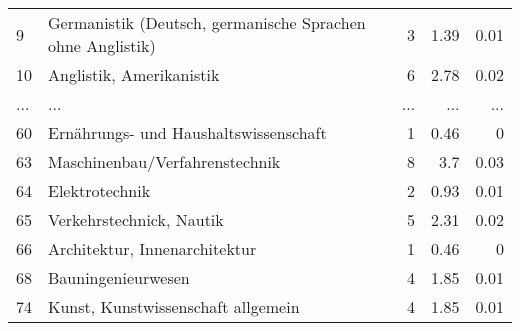 \begin{longtable}{lXrrr}
        9 & \multicolumn{1}{X}{Germanistik (Deutsch, germanische Sprachen ohne Anglistik)} & %
          \num{3} &
          \num[round-mode=places,round-precision=2]{1.39} &
          \num[round-mode=places,round-precision=2]{0.01} \\
        10 & \multicolumn{1}{X}{Anglistik, Amerikanistik} & %
          \num{6} &
          \num[round-mode=places,round-precision=2]{2.78} &
          \num[round-mode=places,round-precision=2]{0.02} \\
       ... & ... & ... & ... & ... \\
        60 & \multicolumn{1}{X}{Ernährungs- und Haushaltswissenschaft} & %
          \num{1} &
          \num[round-mode=places,round-precision=2]{0.46} &
          \num[round-mode=places,round-precision=2]{0} \\

        63 & \multicolumn{1}{X}{Maschinenbau/Verfahrenstechnik} & %
          \num{8} &
          \num[round-mode=places,round-precision=2]{3.7} &
          \num[round-mode=places,round-precision=2]{0.03} \\

        64 & \multicolumn{1}{X}{Elektrotechnik} & %
          \num{2} &
          \num[round-mode=places,round-precision=2]{0.93} &
          \num[round-mode=places,round-precision=2]{0.01} \\

        65 & \multicolumn{1}{X}{Verkehrstechnick, Nautik} & %
          \num{5} &
          \num[round-mode=places,round-precision=2]{2.31} &
          \num[round-mode=places,round-precision=2]{0.02} \\

        66 & \multicolumn{1}{X}{Architektur, Innenarchitektur} & %
          \num{1} &
          \num[round-mode=places,round-precision=2]{0.46} &
          \num[round-mode=places,round-precision=2]{0} \\

        68 & \multicolumn{1}{X}{Bauningenieurwesen} & %
          \num{4} &
          \num[round-mode=places,round-precision=2]{1.85} &
          \num[round-mode=places,round-precision=2]{0.01} \\

        74 & \multicolumn{1}{X}{Kunst, Kunstwissenschaft allgemein} & %
          \num{4} &
          \num[round-mode=places,round-precision=2]{1.85} &
          \num[round-mode=places,round-precision=2]{0.01} \\


\end{longtable}
